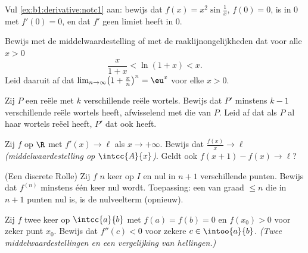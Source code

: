 \begin{exercise}[$\star$]\label{exo:b1:derivative:2}
Vul \cref{ex:b1:derivative:notc1} aan: bewijs dat $f(x) = x^2
\sin\frac1x$, $f(0) = 0$,  is in $0$ met $f'(0) = 0$, en
dat $f'$ geen limiet heeft in $0$.
\end{exercise}

\begin{exercise}[$\star$]\label{exo:b1:derivative:3}
Bewijs met de middelwaardestelling of met de
raaklijnongelijkheden dat voor alle $x > 0$
\[
\frac{x}{1 + x} < \ln(1 + x) < x .
\]
Leid daaruit af dat $\lim_{n\to\infty} \bigl(1 + \frac xn\bigr)^n =
\eu^x$ voor elke $x > 0$.
\end{exercise}

\begin{exercise}[$\star$]\label{exo:b1:derivative:4}
Zij $P$ een reële  met $k$ verschillende reële wortels.
Bewijs dat $P'$ minstens $k - 1$ verschillende reële wortels heeft,
afwisselend met die van $P$. Leid af dat als $P$ al haar wortels
reëel heeft, $P'$ dat ook heeft.
\end{exercise}

\begin{exercise}[$\star\star$]\label{exo:b1:derivative:5}
Zij $f$  op $\R$ met $f'(x)\to \ell$ als $x \to +\infty$.
Bewijs dat $\frac{f(x)}{x} \to \ell$ \emph{(middelwaardestelling op
$\intcc{A}{x}$)}. Geldt ook $f(x+1) - f(x) \to \ell$?
\end{exercise}

\begin{exercise}[$\star\star$]\label{exo:b1:derivative:6}
(Een discrete Rolle) Zij $f$ $n$ keer  op $I$ en nul in $n
+ 1$ verschillende punten. Bewijs dat $f^{(n)}$ minstens één keer
nul wordt. Toepassing: een  van graad $\leq n$ die in $n+1$
punten nul is, is de nulveelterm (opnieuw).
\end{exercise}

\begin{exercise}[$\star\star$]\label{exo:b1:derivative:7}
Zij $f$ twee keer  op $\intcc{a}{b}$ met $f(a) = f(b) = 0$
en $f(x_0) > 0$ voor zeker  punt $x_0$. Bewijs dat $f''(c) <
0$ voor zekere $c \in \intoo{a}{b}$. \emph{(Twee
middelwaardestellingen en een vergelijking van hellingen.)}
\end{exercise}

